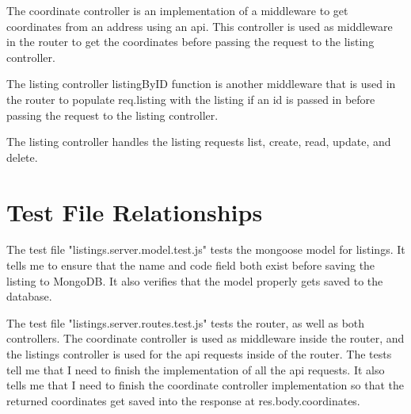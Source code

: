 \documentclass[notitlepage]{article}
\begin{document}
	\par The coordinate controller is an implementation of a
	middleware to get coordinates from an address using an api.
	This controller is used as middleware in the router to get
	the coordinates before passing the request to the listing 
	controller.

	\par The listing controller listingByID function is another middleware
	that is used in the router to populate req.listing with the
	listing if an id is passed in before passing the request to the
	listing controller.

	\par The listing controller handles the listing requests list, create, 
	read, update, and delete.

\section{Test File Relationships}

	\par The test file "listings.server.model.test.js" tests the mongoose
	model for listings. It tells me to ensure that the name and code
	field both exist before saving the listing to MongoDB. It also
	verifies that the model properly gets saved to the database.

	\par The test file "listings.server.routes.test.js" tests the
	router, as well as both controllers. The coordinate controller is
	used as middleware inside the router, and the listings controller
	is used for the api requests inside of the router.
	The tests tell me that I need to finish the implementation of all 
	the api requests.
	It also tells me that I need to finish the coordinate controller
	implementation so that the returned coordinates get saved into
	the response at res.body.coordinates.
\end{document}

